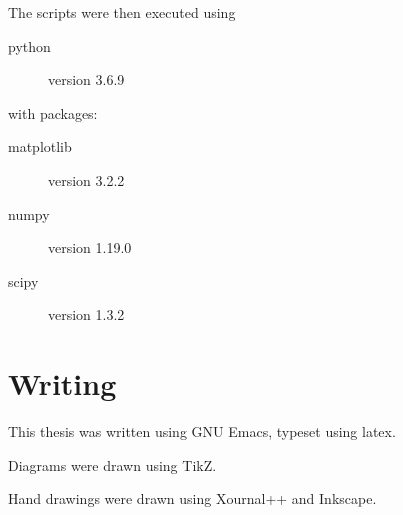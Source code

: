 \documentclass[../main.tex]{subfiles}
\begin{document}
The scripts were then executed using
\begin{description}
\item[python] version 3.6.9
\end{description}
with packages:
\begin{description}
    \item[matplotlib] version 3.2.2
    \item[numpy] version 1.19.0
    \item[scipy] version 1.3.2
\end{description}
\section{Writing}
This thesis was written using GNU Emacs, typeset using \gls{latex}.

Diagrams were drawn using \gls{TikZ}.

Hand drawings were drawn using Xournal++ and Inkscape.
\end{document}
